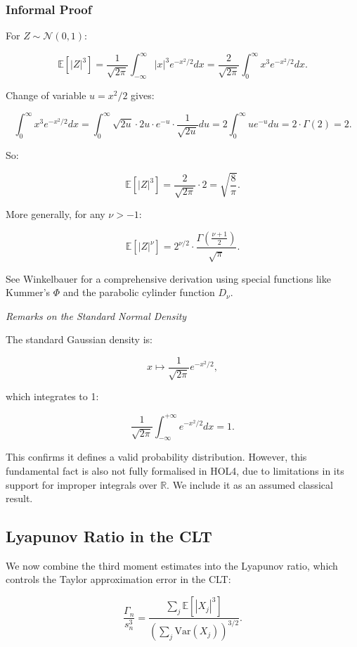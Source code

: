 \subsubsection*{Informal Proof}

For $Z \sim \mathcal{N}(0, 1)$:

\[
\mathbb{E}[|Z|^3] = \frac{1}{\sqrt{2\pi}} \int_{-\infty}^\infty |x|^3 e^{-x^2/2} dx
= \frac{2}{\sqrt{2\pi}} \int_0^\infty x^3 e^{-x^2/2} dx.
\]

Change of variable $u = x^2/2$ gives:

\[
\int_0^\infty x^3 e^{-x^2/2} dx
= \int_0^\infty \sqrt{2u} \cdot 2u \cdot e^{-u} \cdot \frac{1}{\sqrt{2u}} du
= 2 \int_0^\infty u e^{-u} du = 2 \cdot \Gamma(2) = 2.
\]

So:

\[
\mathbb{E}[|Z|^3] = \frac{2}{\sqrt{2\pi}} \cdot 2 = \sqrt{\frac{8}{\pi}}.
\]

More generally, for any $\nu > -1$:

\[
\mathbb{E}[|Z|^\nu] = 2^{\nu/2} \cdot \frac{\Gamma\left( \frac{\nu + 1}{2} \right)}{\sqrt{\pi}}.
\]

See Winkelbauer \cite{winkelbauer2012moments} for a comprehensive derivation using special functions like Kummer's $\Phi$ and the parabolic cylinder function $D_\nu$.

\emph{Remarks on the Standard Normal Density}

The standard Gaussian density is:

\[
x \mapsto \frac{1}{\sqrt{2\pi}} e^{-x^2 / 2},
\]

which integrates to 1:

\[
\frac{1}{\sqrt{2\pi}} \int_{-\infty}^{+\infty} e^{-x^2 / 2} dx = 1.
\]

This confirms it defines a valid probability distribution. However, this fundamental fact is also not fully formalised in HOL4, due to limitations in its support for improper integrals over $\mathbb{R}$. We include it as an assumed classical result.

\subsection{Lyapunov Ratio in the CLT}

We now combine the third moment estimates into the Lyapunov ratio, which controls the Taylor approximation error in the CLT:

\[
\frac{\Gamma_n}{s_n^3}
= \frac{\sum_j \mathbb{E}[|X_j|^3]}{\left( \sum_j \mathrm{Var}(X_j) \right)^{3/2}}.
\]

